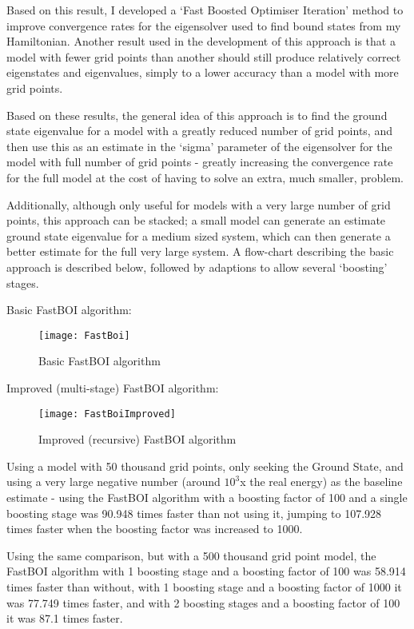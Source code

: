 Based on this result, I developed a `Fast Boosted Optimiser Iteration' method to improve convergence rates for the eigensolver used to find bound states from my Hamiltonian. Another result used in the development of this approach is that a model with fewer grid points than another should still produce relatively correct eigenstates and eigenvalues, simply to a lower accuracy than a model with more grid points. 

Based on these results, the general idea of this approach is to find the ground state eigenvalue for a model with a greatly reduced number of grid points, and then use this as an estimate in the `sigma' parameter of the eigensolver for the model with full number of grid points - greatly increasing the convergence rate for the full model at the cost of having to solve an extra, much smaller, problem. 

Additionally, although only useful for models with a very large number of grid points, this approach can be stacked; a small model can generate an estimate ground state eigenvalue for a medium sized system, which can then generate a better estimate for the full very large system. A flow-chart describing the basic approach is described below, followed by adaptions to allow several `boosting' stages.

Basic FastBOI algorithm:

\begin{figure}[H]
	\texttt{[image: FastBoi]}
	\centering
	\caption{Basic FastBOI algorithm}
\end{figure}

Improved (multi-stage) FastBOI algorithm:
\begin{figure}[H]
	\texttt{[image: FastBoiImproved]}
	\centering
	\caption{Improved (recursive) FastBOI algorithm}
\end{figure}

Using a model with 50 thousand grid points, only seeking the Ground State, and using a very large negative number (around $10^{3}$x the real energy) as the baseline estimate - using the FastBOI algorithm with a boosting factor of 100 and a single boosting stage was 90.948 times faster than not using it, jumping to 107.928 times faster when the boosting factor was increased to 1000. 

Using the same comparison, but with a 500 thousand grid point model, the FastBOI algorithm with 1 boosting stage and a boosting factor of 100 was 58.914 times faster than without, with 1 boosting stage and a boosting factor of 1000 it was 77.749 times faster, and with 2 boosting stages and a boosting factor of 100 it was 87.1 times faster. 

